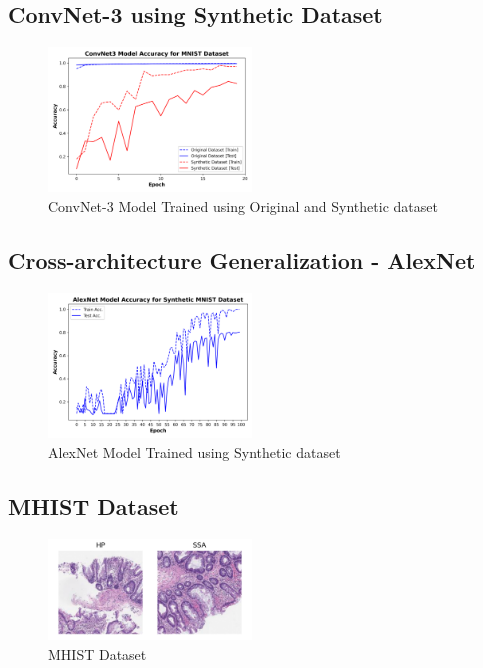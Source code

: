 \documentclass[conference, compsoc]{IEEEtran}
\begin{document}
\subsection{ConvNet-3 using Synthetic Dataset}
\begin{figure}[H]
	\centering
	\includegraphics[width=0.48\textwidth]{mnist_syn_acc.png}
	\caption{ConvNet-3 Model Trained using Original and Synthetic dataset}
	\label{fig:mnist_syn_acc}
\end{figure}
\subsection{Cross-architecture Generalization - AlexNet}
\begin{figure}[H]
	\centering
	\includegraphics[width=0.48\textwidth]{mnist_alex_acc.png}
	\caption{AlexNet Model Trained using Synthetic dataset}
	\label{fig:mnist_alex_acc}
\end{figure}
\subsection{MHIST Dataset}
\begin{figure}[H]
	\centering
	\includegraphics[width=0.48\textwidth]{MHIST_dataset.png}
	\caption{MHIST Dataset \cite{wei2021petri}}
	\label{fig:mhist_dataset}
\end{figure}
\end{document}
